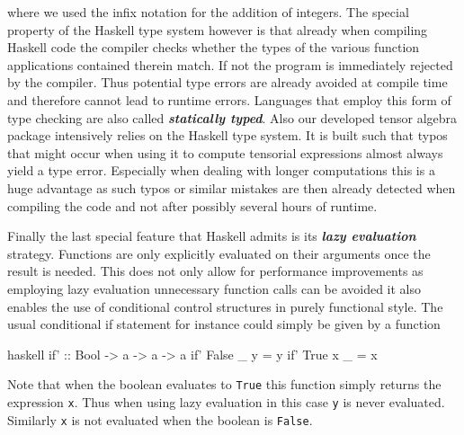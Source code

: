 \documentclass[a4paper,12pt, DIV=14, BCOR=5mm, twoside, headsepline]{scrbook}
\begin{document}
where we used the infix notation for the addition of integers. 
The special property of the Haskell type system however is that already when compiling Haskell code the compiler checks whether the types of the various function applications contained therein match. If not the program is immediately rejected by the compiler. Thus potential type errors are already avoided at compile time and therefore cannot lead to runtime errors. Languages that employ this form of type checking are also called \textit{\textbf{statically typed}}. Also our developed tensor algebra package intensively relies on the Haskell type system. It is built such that typos that might occur when using it to compute tensorial expressions almost always yield a type error. Especially when dealing with longer computations this is a huge advantage as such typos or similar mistakes are then already detected when compiling the code and not after possibly several hours of runtime.  

Finally the last special feature that Haskell admits is its \textit{\textbf{lazy evaluation}} strategy. Functions are only explicitly evaluated on their arguments once the result is needed. This does not only allow for performance improvements as employing lazy evaluation unnecessary function calls can be avoided it also enables the use of conditional control structures in purely functional style. The usual conditional if statement for instance could simply be given by a function
\begin{center}
\begin{cminted}{haskell}
if' :: Bool -> a -> a -> a
if' False _ y = y 
if' True x _ = x 
\end{cminted}
\end{center}
Note that when the boolean evaluates to \texttt{True} this function simply returns the expression \texttt{x}. Thus when using lazy evaluation in this case \texttt{y} is never evaluated. Similarly \texttt{x} is not evaluated when the boolean is \texttt{False}. 
\end{document}
